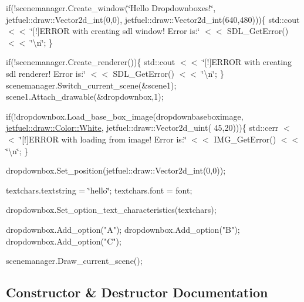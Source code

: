 if(!scenemanager.Create\+\_\+window(\char`\"{}\+Hello Dropdownboxes!\char`\"{}, jetfuel\+::draw\+::\+Vector2d\+\_\+int(0,0), jetfuel\+::draw\+::\+Vector2d\+\_\+int(640,480)))\{ std\+::cout $<$$<$ \char`\"{}\mbox{[}!\mbox{]}\+E\+R\+R\+O\+R with creating sdl window! Error is\+:\char`\"{} $<$$<$ S\+D\+L\+\_\+\+Get\+Error() $<$$<$ \char`\"{}\textbackslash{}n\char`\"{}; \}

if(!scenemanager.Create\+\_\+renderer())\{ std\+::cout $<$$<$ \char`\"{}\mbox{[}!\mbox{]}\+E\+R\+R\+O\+R with creating sdl renderer! Error is\+:\char`\"{} $<$$<$ S\+D\+L\+\_\+\+Get\+Error() $<$$<$ \char`\"{}\textbackslash{}n\char`\"{}; \} scenemanager.\+Switch\+\_\+current\+\_\+scene(\&scene1); scene1.\+Attach\+\_\+drawable(\&dropdownbox,1);

if(!dropdownbox.Load\+\_\+base\+\_\+box\+\_\+image(dropdownbaseboximage, \hyperlink{classjetfuel_1_1draw_1_1Color_ab75797c1cb6e4dd952037916db39b5e8}{jetfuel\+::draw\+::\+Color\+::\+White}, jetfuel\+::draw\+::\+Vector2d\+\_\+uint( 45,20)))\{ std\+::cerr $<$$<$ \char`\"{}\mbox{[}!\mbox{]}\+E\+R\+R\+O\+R with loading from image! Error is\+:\char`\"{} $<$$<$ I\+M\+G\+\_\+\+Get\+Error() $<$$<$ \char`\"{}\textbackslash{}n\char`\"{}; \}

dropdownbox.\+Set\+\_\+position(jetfuel\+::draw\+::\+Vector2d\+\_\+int(0,0));

textchars.\+textstring = \char`\"{}hello\char`\"{}; textchars.\+font = font;

\begin{DoxyVerb}dropdownbox.Set_option_text_characteristics(textchars);

dropdownbox.Add_option("A");
dropdownbox.Add_option("B");
dropdownbox.Add_option("C");

scenemanager.Draw_current_scene();  \end{DoxyVerb}
 

\subsection{Constructor \& Destructor Documentation}
\mbox{\label{classjetfuel_1_1gui_1_1Drop__down__box_af518d68503aa67f76e70fd4e2d9c3cb3}} 
